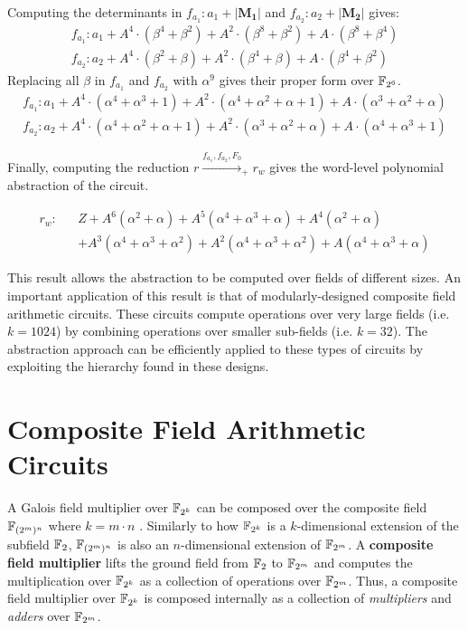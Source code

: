 \begin{Example}
{Computing the determinants in $f_{a_1}: a_1 + |\mathbf{M_1}|$ and $f_{a_2}: a_2 + |\mathbf{M_2}|$ gives:
\begin{eqnarray}
f_{a_1}: a_1+A^4\cdot (\beta^4+\beta^2)+A^2\cdot (\beta^8+\beta^2)+A\cdot (\beta^8+\beta^4) \nonumber \\
f_{a_2}: a_2+A^4\cdot (\beta^2+\beta)+A^2\cdot (\beta^4+\beta)+A\cdot (\beta^4+\beta^2)
\end{eqnarray}
Replacing all $\beta$ in $f_{a_1}$ and $f_{a_2}$ with $\alpha^9$ gives their proper form over ${\mathbb{F}}_{2^6}$.
\begin{eqnarray}
f_{a_1}: a_1+A^4\cdot(\alpha^4+\alpha^3+1)+A^2\cdot(\alpha^4+\alpha^2+\alpha+1)+A\cdot(\alpha^3+\alpha^2+\alpha) \nonumber \\
f_{a_2}: a_2+A^4\cdot(\alpha^4+\alpha^2+\alpha+1)+A^2\cdot(\alpha^3+\alpha^2+\alpha)+A\cdot(\alpha^4+\alpha^3+1)
\end{eqnarray}

Finally, computing the reduction $r\xrightarrow{f_{a_1},f_{a_2},F_0}_+ r_w$ gives the word-level polynomial
abstraction of the circuit.

\begin{eqnarray}
r_w:&&Z+A^6(\alpha^2+\alpha)+A^5(\alpha^4+\alpha^3+\alpha)+A^4(\alpha^2+\alpha) \nonumber \\
&&+A^3(\alpha^4+\alpha^3+\alpha^2)+A^2(\alpha^4+\alpha^3+\alpha^2)+A(\alpha^4+\alpha^3+\alpha) \nonumber
\end{eqnarray}
}
\end{Example}

This result allows the abstraction to be computed over fields of different sizes. 
An important application of this result is that of modularly-designed composite 
field arithmetic circuits.
These circuits compute operations over very large fields (i.e. $k=1024$) by combining 
operations over smaller sub-fields (i.e. $k=32$).
The abstraction approach can be efficiently applied to these types of circuits by
exploiting the hierarchy found in these designs.

\section{Composite Field Arithmetic Circuits}

A Galois field multiplier over ${\mathbb{F}}_{2^k}$ can be composed over the composite field ${\mathbb{F}}_{(2^m)^n}$ 
where $k=m\cdot n$ \cite{phdpaar:1994}. Similarly to how ${\mathbb{F}}_{2^k}$ is a $k$-dimensional 
extension of the subfield ${\mathbb{F}}_2$, ${\mathbb{F}}_{(2^m)^n}$ is also an $n$-dimensional extension of ${\mathbb{F}}_{2^m}$.
A {\bf composite field multiplier} lifts the ground field from ${\mathbb{F}}_2$ to ${\mathbb{F}}_{2^m}$ and
computes the multiplication over ${\mathbb{F}}_{2^k}$ as a collection of operations
over ${\mathbb{F}}_{2^m}$. Thus, a composite field multiplier over ${\mathbb{F}}_{2^k}$ is composed internally as a
collection of {\it multipliers} and {\it adders} over ${\mathbb{F}}_{2^m}$.

